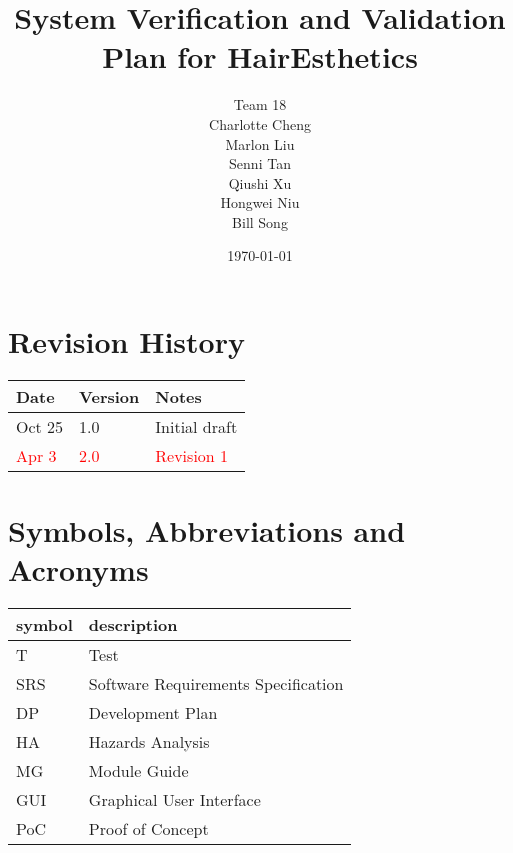 \documentclass[12pt, titlepage]{article}
\begin{document}
\title{System Verification and Validation Plan for HairEsthetics} 
\author{Team 18 \\ Charlotte Cheng
        \\ Marlon Liu
        \\ Senni Tan
        \\ Qiushi Xu
        \\ Hongwei Niu
        \\ Bill Song
}
\date{\today}
	
\maketitle


\section{Revision History}

\begin{tabularx}{\textwidth}{p{3cm}p{2cm}X}
\toprule {\bf Date} & {\bf Version} & {\bf Notes}\\
\midrule
Oct 25 & 1.0 & Initial draft\\
\textcolor{red}{Apr 3} & \textcolor{red}{2.0} & \textcolor{red}{Revision 1}\\
\bottomrule
\end{tabularx}

\newpage

\tableofcontents

\listoftables

\newpage

\section{Symbols, Abbreviations and Acronyms}

\renewcommand{\arraystretch}{1.2}
\begin{tabular}{l l} 
  \toprule		
  \textbf{symbol} & \textbf{description}\\
  \midrule 
  T & Test\\
  SRS & Software Requirements Specification\\
  DP & Development Plan\\
  HA & Hazards Analysis\\
  MG & Module Guide\\
  GUI & Graphical User Interface\\
  PoC & Proof of Concept\\
  \bottomrule
\end{tabular}\\
\end{document}
